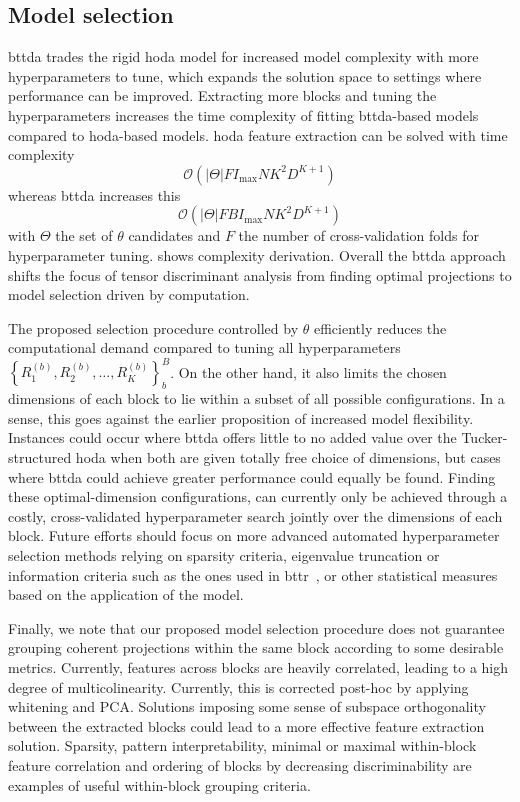 \documentclass[twocolumn]{article}
\begin{document}
\subsection{Model selection}

\Ac{bttda} trades the rigid \ac{hoda} model for increased model complexity with more
hyperparameters to tune, which expands the solution space to settings where
performance can be improved.
Extracting more blocks and tuning the hyperparameters increases the time
complexity of fitting \ac{bttda}-based models compared to \ac{hoda}-based models.
\Ac{hoda} feature extraction can be solved with time complexity
\begin{equation}
	\mathcal{O}\left(\left|\Theta\right|FI_\text{max}NK^2D^{K+1}\right)
\end{equation}
whereas \ac{bttda} increases this
\begin{equation}
	\mathcal{O}\left(\left|\Theta\right|FBI_\text{max}NK^2D^{K+1}\right)
\end{equation}
with $\Theta$ the set of $\theta$ candidates and $F$ the number of
cross-validation folds for hyperparameter tuning.
 shows complexity derivation.
Overall the \ac{bttda} approach shifts the focus of tensor discriminant analysis
from finding optimal projections to model selection driven by computation.

The proposed selection procedure controlled by $\theta$ efficiently
reduces the computational demand compared to tuning all hyperparameters
$\textstyle{\left\{ R_1^{(b)},R_2^{(b)},\ldots,R_K^{(b)}\right\}_b^B}$.
On the other hand, it also limits the chosen dimensions of each block to lie
within a subset of all possible configurations.
In a sense, this goes against the earlier proposition of increased model
flexibility.
Instances could occur where \ac{bttda} offers little to no added value over the
Tucker-structured \ac{hoda} when both are given totally free choice of
dimensions, but cases where \ac{bttda} could achieve greater performance could
equally be found.
Finding these optimal-dimension configurations, can currently only be achieved
through a costly, cross-validated hyperparameter search jointly over the
dimensions of each block.
Future efforts should focus on more advanced automated hyperparameter selection
methods relying on sparsity criteria, eigenvalue truncation or information
criteria such as the ones used in \ac{bttr}~\cite{Faes2022}, or other
statistical measures based on the application of the model.

Finally, we note that our proposed model selection procedure does not
guarantee grouping coherent projections within the same block according to some
desirable metrics.
Currently, features across blocks are heavily correlated, leading to a high
degree of multicolinearity.
Currently, this is corrected  post-hoc by applying whitening and PCA.
Solutions imposing some sense of subspace orthogonality between the extracted
blocks could lead to a more effective feature extraction solution.
Sparsity, pattern interpretability, minimal or maximal within-block feature
correlation and ordering of blocks by decreasing discriminability are
examples of useful within-block grouping criteria.
\end{document}
